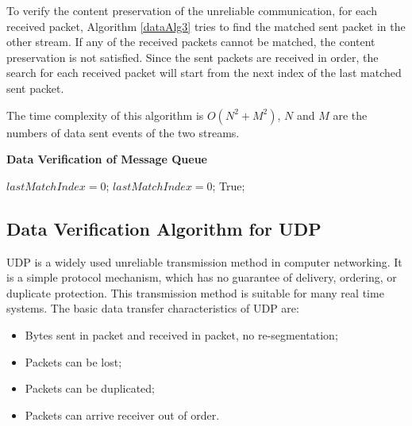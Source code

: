 To verify the content preservation of the unreliable communication, for each received packet, Algorithm \ref{dataAlg3} tries to find the matched sent packet in the other stream. If any of the received packets cannot be matched, the content preservation is not satisfied. Since the sent packets are received in order, the search for each received packet will start from the next index of the last matched sent packet. 

The time complexity of this algorithm is $O(N^2+M^2)$, $N$ and $M$ are the numbers of data sent events of the two streams.
\\
\begin{algorithm}[H]
\DontPrintSemicolon
\caption{{\bf Data Verification of Message Queue } \label{dataAlg3}}
\;
$lastMatchIndex = 0$;\;
$lastMatchIndex = 0$;\;
 \KwRet True;\;
\end{algorithm} 

\subsection{Data Verification Algorithm for UDP}
UDP is a widely used unreliable transmission method in computer networking. It is a simple protocol mechanism, which has no guarantee of delivery, ordering, or duplicate protection. This transmission method is suitable for many real time systems. The basic data transfer characteristics of UDP are:
\begin{itemize}
  \item Bytes sent in packet and received in packet, no re-segmentation;
  \item Packets can be lost;
  \item Packets can be duplicated;
  \item Packets can arrive receiver out of order.
\end{itemize}

